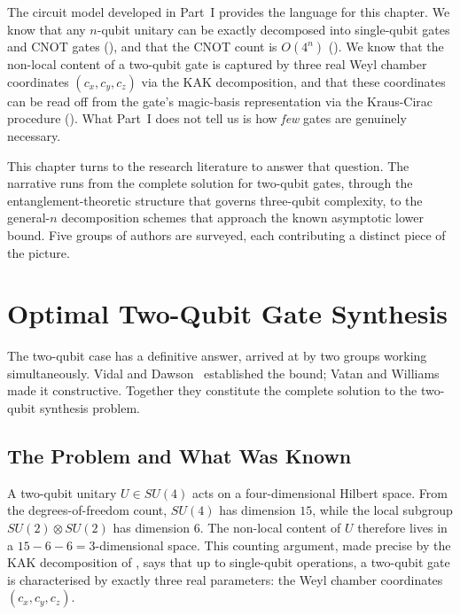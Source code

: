 \documentclass[12pt, a4paper, oneside]{report}
\theoremstyle{plain}
\theoremstyle{definition}
\theoremstyle{remark}
\begin{document}
The circuit model developed in Part~I provides the language for this chapter. We know that
any $n$-qubit unitary can be exactly decomposed into single-qubit gates and CNOT gates
(), and that the CNOT count is $O(4^n)$ ().
We know that the non-local content of a two-qubit gate is captured by three real Weyl chamber
coordinates $(c_x, c_y, c_z)$ via the KAK decomposition, and that these coordinates can be
read off from the gate's magic-basis representation via the Kraus-Cirac procedure
(). What Part~I does not tell us is how \emph{few} gates are genuinely
necessary.

This chapter turns to the research literature to answer that question. The narrative runs
from the complete solution for two-qubit gates, through the entanglement-theoretic structure
that governs three-qubit complexity, to the general-$n$ decomposition schemes that approach
the known asymptotic lower bound. Five groups of authors are surveyed, each contributing a
distinct piece of the picture.


\section{Optimal Two-Qubit Gate Synthesis}
\label{sec:two-qubit-opt}

The two-qubit case has a definitive answer, arrived at by two groups working
simultaneously. Vidal and Dawson~\cite{vidal2004} established the bound; Vatan and
Williams~\cite{vatan2004} made it constructive. Together they constitute the complete
solution to the two-qubit synthesis problem.

\subsection{The Problem and What Was Known}

A two-qubit unitary $U \in SU(4)$ acts on a four-dimensional Hilbert space. From the
degrees-of-freedom count, $SU(4)$ has dimension $15$, while the local subgroup
$SU(2) \otimes SU(2)$ has dimension $6$. The non-local content of $U$ therefore lives in a
$15 - 6 - 6 = 3$-dimensional space. This counting argument, made precise by the KAK
decomposition of , says that up to single-qubit operations, a two-qubit gate
is characterised by exactly three real parameters: the Weyl chamber coordinates
$(c_x, c_y, c_z)$.
\end{document}
